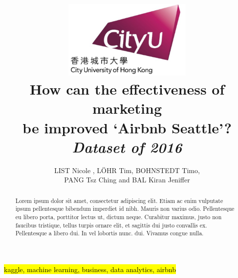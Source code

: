 \documentclass[journal]{IEEEtran}
\begin{document}
    \title{\includegraphics[width=2.5in]{photo/0_cityu} \\
     How can the effectiveness of marketing \\ be improved ‘Airbnb Seattle’? \\ 
     \textit{Dataset of 2016}
     }
  \author{LIST Nicole ,
      L\"OHR Tim,
      BOHNSTEDT Timo,\\
      PANG Tsz Ching 
      and BAL Kiran Jeniffer%
}
\maketitle
\begin{abstract}
Lorem ipsum dolor sit amet, consectetur adipiscing elit. Etiam ac enim vulputate ipsum pellentesque bibendum imperdiet id nibh. Mauris non varius odio. Pellentesque eu libero porta, porttitor lectus ut, dictum neque. Curabitur maximus, justo non faucibus tristique, tellus turpis ornare elit, et sagittis dui justo convallis ex. Pellentesque a libero dui. In vel lobortis nunc. dui. Vivamus congue nulla.
\end{abstract}
\begin{IEEEkeywords}
\hl{kaggle, machine learning, business, data analytics, airbnb}
\end{IEEEkeywords}
\IEEEpeerreviewmaketitle
\end{document}
